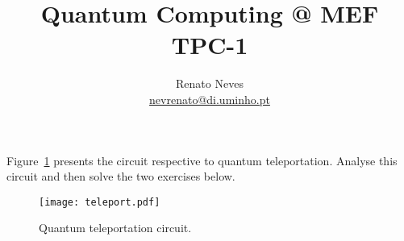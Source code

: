 \documentclass[a4paper, 11pt]{article}
\date{}
\theoremstyle{definition}
\begin{document}
\allowdisplaybreaks[2]
\title{Quantum Computing @ MEF \\ \small{TPC-1}}
\author{Renato Neves \\ \scriptsize
  \href{mailto:nevrenato@di.uminho.pt}{nevrenato@di.uminho.pt}}
\maketitle

\noindent
Figure~\ref{fig:qt} presents the circuit respective to quantum
teleportation. Analyse this circuit and then solve the two exercises
below.
\begin{figure}[h]
  \centering
  \texttt{[image: teleport.pdf]}
  \caption{Quantum teleportation circuit.}
  \label{fig:qt}
\end{figure}
\end{document}
